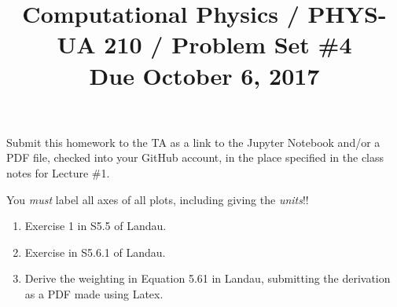 \documentclass[11pt, preprint]{aastex}
\begin{document}
\title{\bf Computational Physics / PHYS-UA 210 / Problem Set \#4
\\ Due October 6, 2017 }

Submit this homework to the TA as a link to the Jupyter Notebook
and/or a PDF file, checked into your GitHub account, in the place
specified in the class notes for Lecture \#1.

You {\it must} label all axes of all plots, including giving the {\it
  units}!!

\begin{enumerate}
  \item Exercise 1 in S5.5 of Landau.

  \item Exercise in S5.6.1 of Landau.

  \item Derive the weighting in Equation 5.61 in Landau, submitting
    the derivation as a PDF made using Latex.

\end{enumerate}
\end{document}
